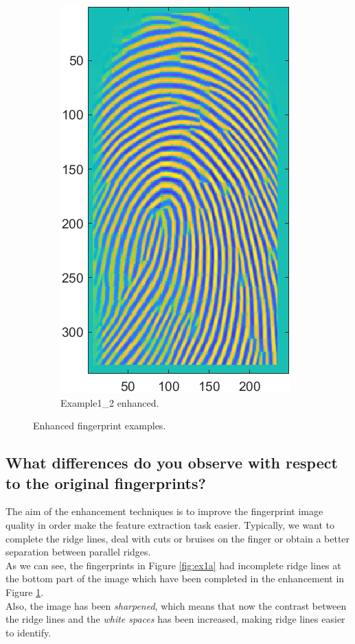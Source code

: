 \documentclass[a4paper]{article}
\begin{document}
\begin{figure}[H]
\begin{subfigure}[t]{0.45\textwidth}
         \includegraphics[scale=0.6]{Figures/Enhanced2}
         \caption{Example1\_2 enhanced.}
     \end{subfigure}
    \caption{Enhanced fingerprint examples.}
    \label{fig:ex2a}
\end{figure}


\subsection{ What differences do you observe with respect to the original fingerprints?}

The aim of the enhancement techniques is to improve the fingerprint image quality in order make the feature extraction task easier. Typically, we want to complete the ridge lines, deal with cuts or bruises on the finger or obtain a better separation between parallel ridges.\\

As we can see, the fingerprints in Figure \ref{fig:ex1a} had incomplete ridge lines at the bottom part of the image which have been completed in the enhancement in Figure \ref{fig:ex2a}.\\

Also, the image has been \emph{sharpened}, which means that now the contrast between the ridge lines and the \emph{white spaces} has been increased, making ridge lines easier to identify.
\end{document}
